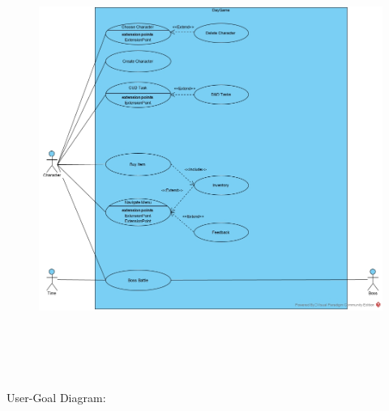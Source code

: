 \documentclass[12pt]{report}
\renewcommand{\_}{\kern-1.5pt\textunderscore\kern-1.5pt}
\begin{document}
\begin{figure}[H]
	\begin{Center}
		\includegraphics[width=6.3in,height=5.58in]{./media/image1.jpg}
	\end{Center}
\end{figure}



\newpage
{\fontsize{14pt}{16.8pt}\selectfont User-Goal Diagram:\par}\par



\end{document}
